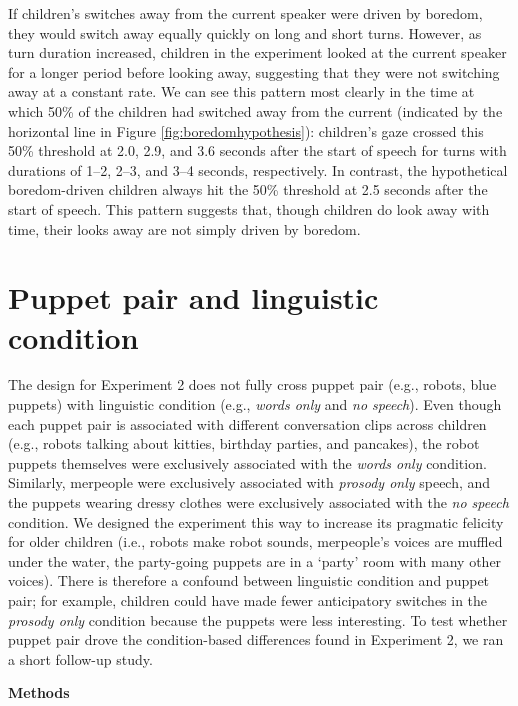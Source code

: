 \documentclass[authoryear, 12pt]{elsarticle}
\begin{document}
If children's switches away from the current speaker were driven by boredom, they would switch away equally quickly on long and short turns. However, as turn duration increased, children in the experiment looked at the current speaker for a longer period before looking away, suggesting that they were not switching away at a constant rate. We can see this pattern most clearly in the time at which 50\% of the children had switched away from the current (indicated by the horizontal line in Figure \ref{fig:boredomhypothesis}): children's gaze crossed this 50\% threshold at 2.0, 2.9, and 3.6 seconds after the start of speech for turns with durations of 1--2, 2--3, and 3--4 seconds, respectively. In contrast, the hypothetical boredom-driven children always hit the 50\% threshold at 2.5 seconds after the start of speech. This pattern suggests that, though children do look away with time, their looks away are not simply driven by boredom.

\clearpage

\section{Puppet pair and linguistic condition}
\label{sec:puppetconfound}
\setcounter{figure}{0}  
The design for Experiment 2 does not fully cross puppet pair (e.g., robots, blue puppets) with linguistic condition (e.g., \textit{words only} and \textit{no speech}). Even though each puppet pair is associated with different conversation clips across children (e.g., robots talking about kitties, birthday parties, and pancakes), the robot puppets themselves were exclusively associated with the \textit{words only} condition. Similarly, merpeople were exclusively associated with \textit{prosody only} speech, and the puppets wearing dressy clothes were exclusively associated with the \textit{no speech} condition. We designed the experiment this way to increase its pragmatic felicity for older children (i.e., robots make robot sounds, merpeople's voices are muffled under the water, the party-going puppets are in a `party' room with many other voices). There is therefore a confound between linguistic condition and puppet pair; for example, children could have made fewer anticipatory switches in the \textit{prosody only} condition because the puppets were less interesting. To test whether puppet pair drove the condition-based differences found in Experiment 2, we ran a short follow-up study.

\bigskip
\noindent \textbf{Methods}
\medskip
\end{document}
